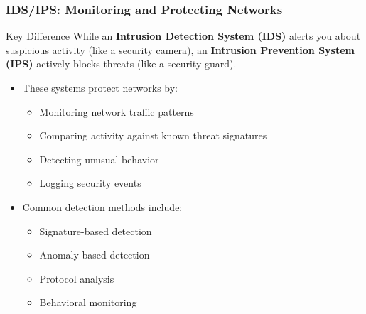 \documentclass{beamer}
\begin{document}
\begin{frame}
    \frametitle{IDS/IPS: Monitoring and Protecting Networks}
    
    \begin{alertblock}{Key Difference}
        While an \textbf{Intrusion Detection System (IDS)} alerts you about suspicious activity (like a security camera), an \textbf{Intrusion Prevention System (IPS)} actively blocks threats (like a security guard).
    \end{alertblock}
    
    \begin{itemize}
        \item These systems protect networks by:
        \begin{itemize}
            \item Monitoring network traffic patterns
            \item Comparing activity against known threat signatures
            \item Detecting unusual behavior
            \item Logging security events
        \end{itemize}
        
        \item Common detection methods include:
        \begin{itemize}
            \item Signature-based detection
            \item Anomaly-based detection
            \item Protocol analysis
            \item Behavioral monitoring
        \end{itemize}
    \end{itemize}
\end{frame}
\end{document}
